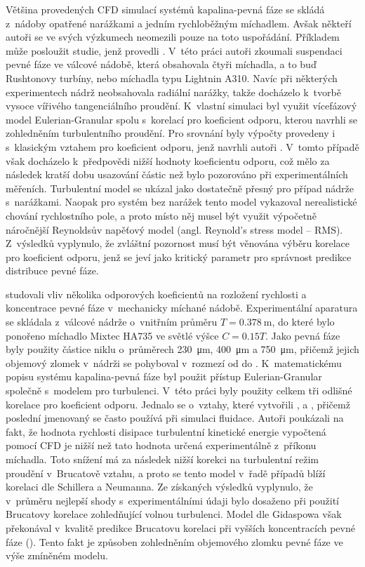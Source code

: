 Většina provedených CFD simulací systémů kapalina-pevná fáze se skládá z~nádoby opatřené narážkami a jedním rychloběžným míchadlem. Avšak někteří autoři se ve svých výzkumech neomezili pouze na toto uspořádání. Příkladem může posloužit studie, jenž provedli \citet{mon04}. V~této práci autoři zkoumali suspendaci pevné fáze ve válcové nádobě, která obsahovala čtyři míchadla, a to buď Rushtonovy turbíny, nebo míchadla typu Lightnin A310. Navíc při některých experimentech nádrž neobsahovala radiální narážky, takže docházelo k~tvorbě vysoce vířivého tangenciálního proudění. K~vlastní simulaci byl využit vícefázový model Eulerian-Granular spolu s~korelací pro koeficient odporu, kterou navrhli \citet{pin01} se zohledněním turbulentního proudění. Pro srovnání byly výpočty provedeny i s~klasickým vztahem pro koeficient odporu, jenž navrhli autoři \citet{schi32}. V~tomto případě však docházelo k~předpovědi nižší hodnoty koeficientu odporu, což mělo za následek kratší dobu usazování částic než bylo pozorováno při experimentálních měřeních. Turbulentní model \keps{} se ukázal jako dostatečně přesný pro případ nádrže s~narážkami. Naopak pro systém bez narážek tento model vykazoval nerealistické chování rychlostního pole, a proto místo něj musel být využit výpočetně náročnější Reynoldsův napěťový model (angl. Reynold's stress model -- RMS). Z~výsledků vyplynulo, že zvláštní pozornost musí být věnována výběru korelace pro koeficient odporu, jenž se jeví jako kritický parametr pro správnost predikce distribuce pevné fáze.

\citet{ochi08} studovali vliv několika odporových koeficientů na rozložení rychlosti a koncentrace pevné fáze v~mechanicky míchané nádobě. Experimentální aparatura se skládala z~válcové nádrže o~vnitřním průměru $T=\SI{0.378}{\meter}$, do které bylo ponořeno míchadlo Mixtec HA735 ve světlé výšce $C=\num{0.15}T$. Jako pevná fáze byly použity částice niklu o~průměrech \SI{230}{\micro\meter}, \SI{400}{\micro\meter} a \SI{750}{\micro\meter}, přičemž jejich objemový zlomek v~nádrži se pohyboval v~rozmezí od  do . K~matematickému popisu systému kapalina-pevná fáze byl použit přístup Eulerian-Granular společně s~modelem \keps{} pro turbulenci. V~této práci byly použity celkem tři odlišné korelace pro koeficient odporu. Jednalo se o~vztahy, které vytvořili \citet{schi32}, \citet{bru98} a \citet{gid94}, přičemž poslední jmenovaný se často používá při simulaci fluidace. Autoři poukázali na fakt, že hodnota rychlosti disipace turbulentní kinetické energie vypočtená pomocí CFD je nižší než tato hodnota určená experimentálně z~příkonu míchadla. Toto snížení má za následek nižší korekci na turbulentní režim proudění v~Brucatově vztahu, a proto se tento model v~řadě případů blíží korelaci dle Schillera a Neumanna. Ze získaných výsledků vyplynulo, že v~průměru nejlepší shody s~experimentálními údaji bylo dosaženo při použití Brucatovy korelace zohledňující volnou turbulenci. Model dle Gidaspowa však překonával v~kvalitě predikce Brucatovu korelaci při vyšších koncentracích pevné fáze (). Tento fakt je způsoben zohledněním objemového zlomku pevné fáze ve výše zmíněném modelu.

